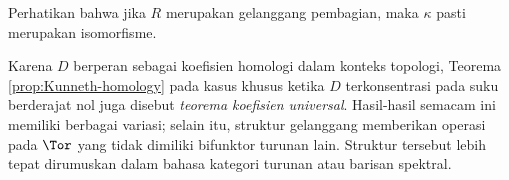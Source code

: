 Perhatikan bahwa jika $R$ merupakan gelanggang pembagian, maka $\kappa$ pasti
merupakan isomorfisme.

Karena $D$ berperan sebagai koefisien homologi dalam konteks topologi, Teorema
\ref{prop:Kunneth-homology} pada kasus khusus ketika $D$ terkonsentrasi pada
suku berderajat nol juga disebut \emph{teorema koefisien universal}.
Hasil-hasil semacam ini memiliki berbagai variasi; selain itu, struktur
gelanggang memberikan operasi pada $\Tor$ yang tidak dimiliki bifunktor
turunan lain. Struktur tersebut lebih tepat dirumuskan dalam bahasa
kategori turunan atau barisan spektral.
